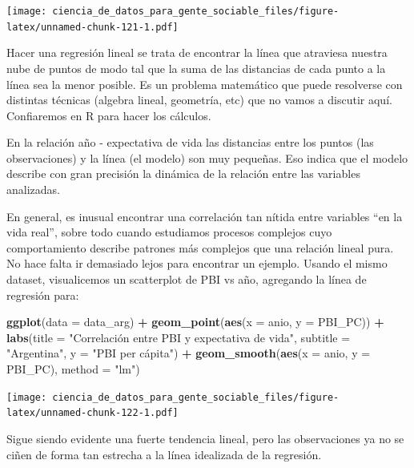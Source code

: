 \documentclass[spanish,]{book}
\newenvironment{Shaded}{\begin{snugshade}}{\end{snugshade}}
\newcommand{\DataTypeTok}[1]{\textcolor[rgb]{0.13,0.29,0.53}{#1}}
\newcommand{\KeywordTok}[1]{\textcolor[rgb]{0.13,0.29,0.53}{\textbf{#1}}}
\newcommand{\NormalTok}[1]{#1}
\newcommand{\OperatorTok}[1]{\textcolor[rgb]{0.81,0.36,0.00}{\textbf{#1}}}
\newcommand{\StringTok}[1]{\textcolor[rgb]{0.31,0.60,0.02}{#1}}
\begin{document}
\texttt{[image: ciencia\_de\_datos\_para\_gente\_sociable\_files/figure-latex/unnamed-chunk-121-1.pdf]}

Hacer una regresión lineal se trata de encontrar la línea que atraviesa nuestra nube de puntos de modo tal que la suma de las distancias de cada punto a la línea sea la menor posible. Es un problema matemático que puede resolverse con distintas técnicas (algebra lineal, geometría, etc) que no vamos a discutir aquí. Confiaremos en R para hacer los cálculos.

En la relación año - expectativa de vida las distancias entre los puntos (las observaciones) y la línea (el modelo) son muy pequeñas. Eso indica que el modelo describe con gran precisión la dinámica de la relación entre las variables analizadas.

En general, es inusual encontrar una correlación tan nítida entre variables ``en la vida real'', sobre todo cuando estudiamos procesos complejos cuyo comportamiento describe patrones más complejos que una relación lineal pura. No hace falta ir demasiado lejos para encontrar un ejemplo. Usando el mismo dataset, visualicemos un scatterplot de PBI vs año, agregando la línea de regresión para:

\begin{Shaded}
\begin{Highlighting}[]
\KeywordTok{ggplot}\NormalTok{(}\DataTypeTok{data =}\NormalTok{ data_arg) }\OperatorTok{+}\StringTok{ }
\StringTok{    }\KeywordTok{geom_point}\NormalTok{(}\KeywordTok{aes}\NormalTok{(}\DataTypeTok{x =}\NormalTok{ anio, }\DataTypeTok{y =}\NormalTok{ PBI_PC)) }\OperatorTok{+}
\StringTok{    }\KeywordTok{labs}\NormalTok{(}\DataTypeTok{title =} \StringTok{"Correlación entre PBI y expectativa de vida"}\NormalTok{,}
         \DataTypeTok{subtitle =} \StringTok{"Argentina"}\NormalTok{,}
         \DataTypeTok{y =} \StringTok{"PBI per cápita"}\NormalTok{) }\OperatorTok{+}
\StringTok{    }\KeywordTok{geom_smooth}\NormalTok{(}\KeywordTok{aes}\NormalTok{(}\DataTypeTok{x =}\NormalTok{ anio, }\DataTypeTok{y =}\NormalTok{ PBI_PC), }\DataTypeTok{method =} \StringTok{"lm"}\NormalTok{)}
\end{Highlighting}
\end{Shaded}

\texttt{[image: ciencia\_de\_datos\_para\_gente\_sociable\_files/figure-latex/unnamed-chunk-122-1.pdf]}

Sigue siendo evidente una fuerte tendencia lineal, pero las observaciones ya no se ciñen de forma tan estrecha a la línea idealizada de la regresión.
\end{document}
